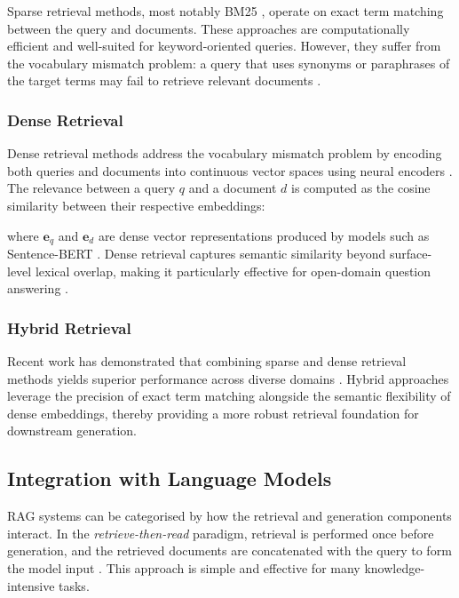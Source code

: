 Sparse retrieval methods, most notably BM25 \cite{robertson2009probabilistic}, operate on exact term matching between the query and documents. These approaches are computationally efficient and well-suited for keyword-oriented queries. However, they suffer from the vocabulary mismatch problem: a query that uses synonyms or paraphrases of the target terms may fail to retrieve relevant documents \cite{chen2017reading}.

\subsubsection{Dense Retrieval}

Dense retrieval methods address the vocabulary mismatch problem by encoding both queries and documents into continuous vector spaces using neural encoders \cite{karpukhin2020dense}. The relevance between a query \(q\) and a document \(d\) is computed as the cosine similarity between their respective embeddings:


where \(\mathbf{e}_q\) and \(\mathbf{e}_d\) are dense vector representations produced by models such as Sentence-BERT \cite{reimers2019sentence}. Dense retrieval captures semantic similarity beyond surface-level lexical overlap, making it particularly effective for open-domain question answering \cite{karpukhin2020dense}.

\subsubsection{Hybrid Retrieval}

Recent work has demonstrated that combining sparse and dense retrieval methods yields superior performance across diverse domains \cite{gao2023retrieval}. Hybrid approaches leverage the precision of exact term matching alongside the semantic flexibility of dense embeddings, thereby providing a more robust retrieval foundation for downstream generation.

\subsection{Integration with Language Models}

RAG systems can be categorised by how the retrieval and generation components interact. In the \emph{retrieve-then-read} paradigm, retrieval is performed once before generation, and the retrieved documents are concatenated with the query to form the model input \cite{chen2017reading, lewis2020retrieval}. This approach is simple and effective for many knowledge-intensive tasks.

